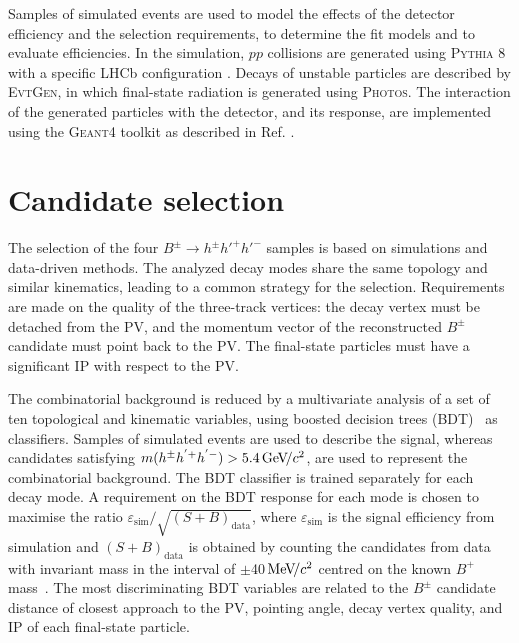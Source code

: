 \documentclass[12pt,a4paper]{article}
\def\PB      {\ensuremath{\mathrm{B}}\xspace}
\def\Ph      {\ensuremath{\mathrm{h}}\xspace}
\def\PB      {\ensuremath{B}\xspace}
\def\Ph      {\ensuremath{h}\xspace}
\def\B       {{\ensuremath{\PB}}\xspace}
\def\Bpm     {{\ensuremath{\B^\pm}}\xspace}
\newcommand{\decay}[2]{\ensuremath{#1\!\to #2}\xspace}
\def\to                 {\ensuremath{\rightarrow}\xspace}
\def\Bhhh        {\decay{\Bpm}{\Ph^{\pm} \Ph'^+\Ph'^-}}
\newcommand{\aunit}[1]{\ensuremath{\text{\,#1}}}
\newcommand{\mevcc}{\ensuremath{\aunit{Me\kern -0.1em V\!/}c^2}\xspace}
\newcommand{\gevcc}{\ensuremath{\aunit{Ge\kern -0.1em V\!/}c^2}\xspace}
\def\evtgen     {\mbox{\textsc{EvtGen}}\xspace}
\def\geant      {\mbox{\textsc{Geant4}}\xspace}
\def\photos     {\mbox{\textsc{Photos}}\xspace}
\def\pythia     {\mbox{\textsc{Pythia}}\xspace}
\begin{document}
Samples of simulated events are used to model the effects of the detector efficiency and the selection requirements, to determine the fit models and to evaluate efficiencies. In the simulation, $pp$ collisions are generated using \pythia 8 \cite{Sj_strand_2015} with a specific LHCb configuration \cite{LHCb-PROC-2010-056}. Decays of unstable particles are described by \evtgen \cite{Lange:2001uf}, in which final-state radiation is generated using \photos \cite{davidson2015photos}. The interaction of the generated particles with the detector, and its response, are implemented using the \geant toolkit \cite{Agostinelli:2002hh,Allison:2006ve} as described in Ref. \cite{LHCb-PROC-2011-006}.



\section{Candidate selection}
\label{sec:selection}

The selection of the four \Bhhh samples is based on simulations and data-driven methods. The analyzed  decay modes share the same topology and similar kinematics, leading to a common strategy for the selection. Requirements are made on the quality of the three-track vertices: the decay vertex must be detached from the PV, and the momentum vector of the reconstructed \Bpm candidate must point back to the PV\@. The final-state particles must have a significant IP with respect to the PV\@.

The combinatorial background is reduced by a multivariate analysis of a set of ten topological and kinematic variables, using boosted decision trees (BDT)~\cite{Breiman} as classifiers. 
Samples of simulated events are used to describe the signal, whereas candidates satisfying $m(h^\pm h^{'+} h^{'-})>5.4\gevcc$, are used to represent the combinatorial background. The BDT classifier is trained separately for each decay mode. 
A requirement on the BDT response for each mode is chosen to maximise the ratio $\varepsilon_{\textrm{sim}}/\sqrt{(S+B)_{\textrm{data}}}$, where $\varepsilon_{\textrm{sim}}$ is the signal efficiency from simulation and $(S+B)_{\textrm{data}}$ is obtained by counting the candidates from data with invariant mass in the interval of $\pm$40\mevcc centred on the known $B^+$ mass~\cite{PDG2020}. The most discriminating BDT variables are related to the $B^{\pm}$ candidate distance of closest approach to the PV, pointing angle, decay vertex quality, and IP of each final-state particle.
\end{document}
